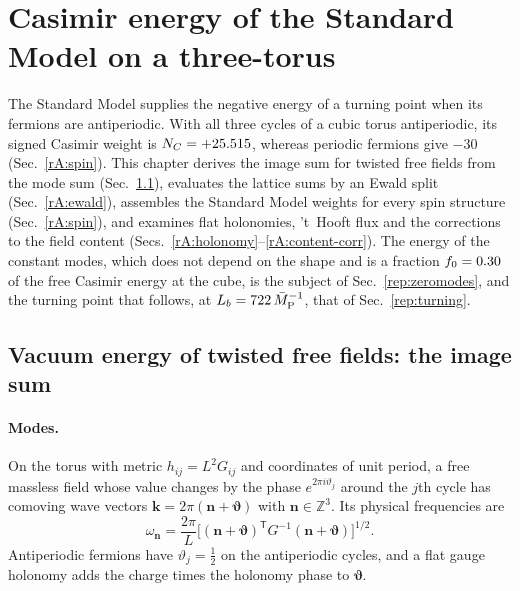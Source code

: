 \section{Casimir energy of the Standard Model on a three-torus}\label{rep:casimir}

The Standard Model supplies the negative energy of a turning point when its fermions are antiperiodic.
With all three cycles of a cubic torus antiperiodic, its signed Casimir weight is $N_C=+25.515$, whereas periodic fermions give $-30$ (Sec.~\ref{rA:spin}). %
This chapter derives the image sum for twisted free fields from the mode sum (Sec.~\ref{rA:imagesum}), evaluates the lattice sums by an Ewald split (Sec.~\ref{rA:ewald}), assembles the Standard Model weights for every spin structure (Sec.~\ref{rA:spin}), and examines flat holonomies, 't~Hooft flux and the corrections to the field content (Secs.~\ref{rA:holonomy}--\ref{rA:content-corr}).
The energy of the constant modes, which does not depend on the shape and is a fraction $f_0=0.30$ of the free Casimir energy at the cube, is the subject of Sec.~\ref{rep:zeromodes}, and the turning point that follows, at $L_b=722\,\bar M_{\mathrm{P}}^{-1}$, that of Sec.~\ref{rep:turning}. %

\subsection{Vacuum energy of twisted free fields: the image sum}
\label{rA:imagesum}

\paragraph{Modes.}
On the torus with metric $h_{ij}=L^2G_{ij}$ and coordinates of unit period, a free massless field whose value changes by the phase $e^{2\pi i\vartheta_j}$ around the $j$th cycle has comoving wave vectors $\bm k=2\pi(\bm n+\bm\vartheta)$ with $\bm n\in\mathbb Z^3$.
Its physical frequencies are
\begin{equation}
\omega_{\bm n}=\frac{2\pi}{L}\Big[(\bm n+\bm\vartheta)^{\mathsf T}G^{-1}(\bm n+\bm\vartheta)\Big]^{1/2}.
\label{eq:rA-modes}
\end{equation}
Antiperiodic fermions have $\vartheta_j=\tfrac12$ on the antiperiodic cycles, and a flat gauge holonomy adds the charge times the holonomy phase to $\bm\vartheta$.

